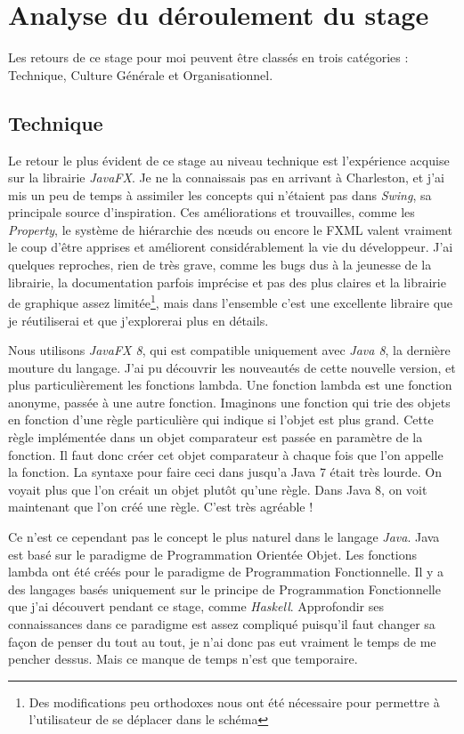 ﻿\chapter{Analyse du déroulement du stage}
Les retours de ce stage pour moi peuvent être classés en trois catégories : Technique, Culture Générale et Organisationnel.

\section{Technique}
Le retour le plus évident de ce stage au niveau technique est l'expérience acquise sur la librairie \textit{JavaFX}. Je ne la connaissais pas en arrivant à Charleston, et j'ai mis un peu de temps à assimiler les concepts qui n'étaient pas dans \textit{Swing}, sa principale source d'inspiration. Ces améliorations et trouvailles, comme les \textit{Property}, le système de hiérarchie des nœuds ou encore le FXML valent vraiment le coup d'être apprises et améliorent considérablement la vie du développeur. J'ai quelques reproches, rien de très grave, comme les bugs dus à la jeunesse de la librairie, la documentation parfois imprécise et pas des plus claires et la librairie de graphique assez limitée\footnote{Des modifications peu orthodoxes nous ont été nécessaire pour permettre à l'utilisateur de se déplacer dans le schéma}, mais dans l'ensemble c'est une excellente libraire que je réutiliserai et que j'explorerai plus en détails.

Nous utilisons \textit{JavaFX 8}, qui est compatible uniquement avec \textit{Java 8}, la dernière mouture du langage. J'ai pu découvrir les nouveautés de cette nouvelle version, et plus particulièrement les fonctions lambda. Une fonction lambda est une fonction anonyme, passée à une autre fonction. Imaginons une fonction qui trie des objets en fonction d'une règle particulière qui indique si l'objet est plus grand. Cette règle implémentée dans un objet comparateur est passée en paramètre de la fonction. Il faut donc créer cet objet comparateur à chaque fois que l'on appelle la fonction. La syntaxe pour faire ceci dans jusqu'a Java 7 était très lourde. On voyait plus que l'on créait un objet plutôt qu'une règle. Dans Java 8, on voit maintenant que l'on créé une règle. C'est très agréable !

Ce n'est ce cependant pas le concept le plus naturel dans le langage \textit{Java}. Java est basé sur le paradigme de Programmation Orientée Objet. Les fonctions lambda ont été créés pour le paradigme de Programmation Fonctionnelle. Il y a des langages basés uniquement sur le principe de Programmation Fonctionnelle que j'ai découvert pendant ce stage, comme \textit{Haskell}. Approfondir ses connaissances dans ce paradigme est assez compliqué puisqu'il faut changer sa façon de penser du tout au tout, je n'ai donc pas eut vraiment le temps de me pencher dessus. Mais ce manque de temps n'est que temporaire.

